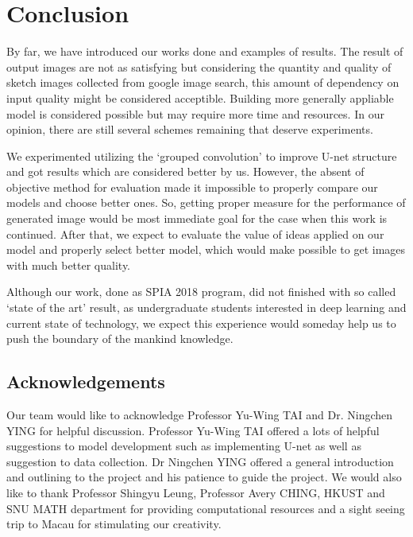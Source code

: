 \chapter{Conclusion}\label{Ch:Conclusion}

By far, we have introduced our works done and examples of results. The result of output images are not as satisfying but considering the quantity and quality of sketch images collected from google image search, this amount of dependency on input quality might be considered acceptible. Building more generally appliable model is considered possible but may require more time and resources. In our opinion, there are still several schemes remaining that deserve experiments.

We experimented utilizing the `grouped convolution' to improve U-net structure and got results which are considered better by us. However, the absent of objective method for evaluation made it impossible to properly compare our models and choose better ones. So, getting proper measure for the performance of generated image would be most immediate goal for the case when this work is continued. After that, we expect to evaluate the value of ideas applied on our model and properly select better model, which would make possible to get images with much better quality.


Although our work, done as SPIA 2018 program, did not finished with so called `state of the art' result, as undergraduate students interested in deep learning and current state of technology, we expect this experience would someday help us to push the boundary of the mankind knowledge. 

\section{Acknowledgements}

Our team would like to acknowledge Professor Yu-Wing TAI and Dr. Ningchen YING for helpful discussion. Professor Yu-Wing TAI offered a lots of helpful suggestions to model development such as implementing U-net as well as suggestion to data collection. Dr Ningchen YING offered a general introduction and outlining to the project and his patience to guide the project. We would also like to thank Professor Shingyu Leung, Professor Avery CHING, HKUST and SNU MATH department for providing computational resources and a sight seeing trip to Macau for stimulating our creativity. 

\endinput
